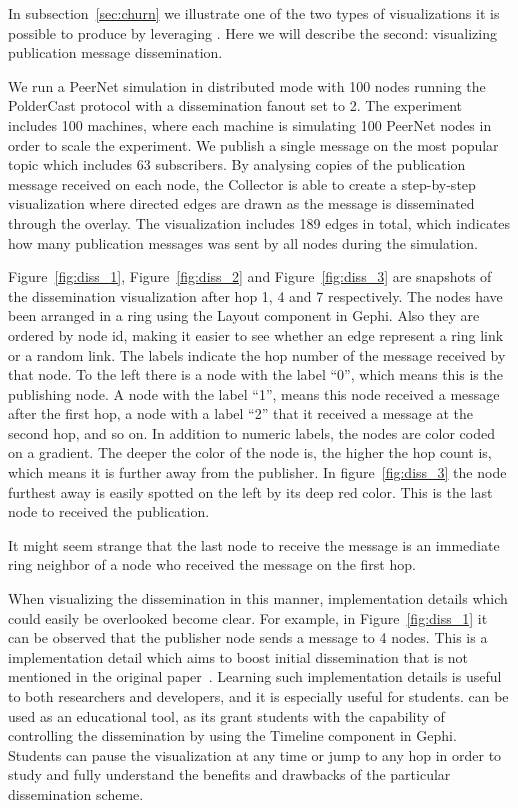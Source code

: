 In subsection~\ref{sec:churn} we illustrate one of the two types of
visualizations it is possible to produce by leveraging \demo. Here we will describe the second:
visualizing publication message dissemination.

We run a PeerNet simulation in distributed mode with 100 nodes running
the PolderCast protocol with a dissemination fanout set to 2. The
experiment includes 100 machines, where each machine is simulating 100
PeerNet nodes in order to scale the experiment.  We publish a single
message on the most popular topic which includes 63 subscribers. By
analysing copies of the publication message received on each node, the
Collector is able to create a step-by-step visualization where directed
edges are drawn as the message is disseminated through the overlay. The
visualization includes 189 edges in total, which indicates how many
publication messages was sent by all nodes during the simulation.

Figure~\ref{fig:diss_1}, Figure~\ref{fig:diss_2} and
Figure~\ref{fig:diss_3}
are snapshots of the dissemination visualization after hop 1, 4 and 7
respectively. The nodes have been arranged in a ring using the Layout
component in Gephi. Also they are ordered by node id, making it easier
to see whether an edge represent a ring link or a random link. The
labels indicate the hop number of the message received by that node. To
the left there is a node with the label ``0'',
which means this is the publishing node. A node with the label ``1'',
means this node received a message after the first hop, a node with a
label ``2'' that it received a message at the second hop, and so on. In
addition to numeric labels, the nodes are color coded on a gradient. The
deeper the color of the node is, the higher the hop count is, which
means it is further away from the publisher. In figure~\ref{fig:diss_3}
the node furthest away is easily spotted on the left by its deep
red color. This is the last node to received the publication.

It might seem strange that the last node to receive the message is an
immediate ring neighbor of a node who received the message on the first
hop.

When visualizing the dissemination in this manner, implementation
details which could easily be overlooked become clear. For example,
in Figure~\ref{fig:diss_1} it can be observed that the publisher node
sends a message to 4 nodes. This is a implementation detail which aims
to boost initial dissemination that is not mentioned in the original
paper~\cite{Setty:2012}. Learning such implementation details is useful
to both researchers and developers, and it is especially useful for
students. \demo can be used as an educational tool, as its grant
students with the capability of controlling the dissemination by using
the Timeline component in Gephi. Students can pause the visualization at
any time or jump to any hop in order to study and fully understand the
benefits and drawbacks of the particular dissemination scheme.

